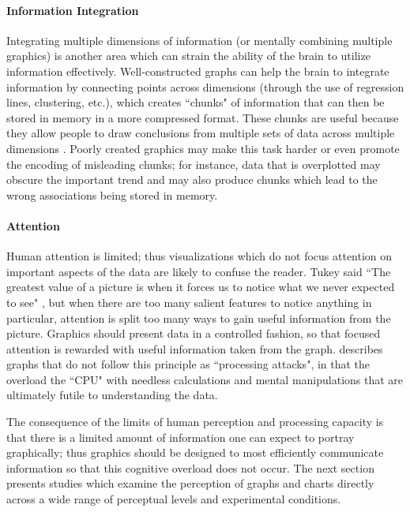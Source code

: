 \documentclass[11pt]{isuthesis}\usepackage[]{graphicx}\usepackage[]{color}
\begin{document}
\paragraph{Information Integration}
Integrating multiple dimensions of information (or mentally combining multiple graphics) is another area which can strain the ability of the brain to utilize information effectively. Well-constructed graphs can help the brain to integrate information by connecting points across dimensions (through the use of regression lines, clustering, etc.), which creates ``chunks" of information that can then be stored in memory in a more compressed format. These chunks are useful because they allow people to draw conclusions from multiple sets of data across multiple dimensions \citep{gattis1996mapping}. Poorly created graphics may make this task harder or even promote the encoding of misleading chunks; for instance, data that is overplotted may obscure the important trend and may also produce chunks which lead to the wrong associations being stored in memory. 

\paragraph{Attention}
Human attention is limited; thus visualizations which do not focus attention on important aspects of the data are likely to confuse the reader. Tukey said ``The greatest value of a picture is when it forces us to notice what we never expected to see" \citep{eda}, but when there are too many salient features to notice anything in particular, attention is split too many ways to gain useful information from the picture. Graphics should present data in a controlled fashion, so that focused attention is rewarded with useful information taken from the graph. \citet{conti2005attacking} describes graphs that do not follow this principle as ``processing attacks", in that the overload the ``CPU" with needless calculations and mental manipulations that are ultimately futile to understanding the data. 

The consequence of the limits of human perception and processing capacity is that there is a limited amount of information one can expect to portray graphically; thus graphics should be designed to most efficiently communicate information so that this cognitive overload does not occur. The next section presents studies which examine the perception of graphs and charts directly across a wide range of perceptual levels and experimental conditions. 
\end{document}
